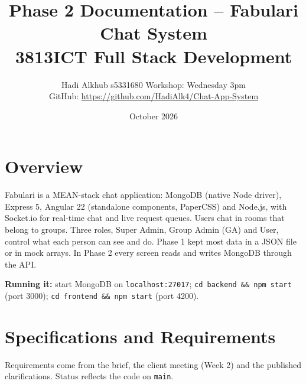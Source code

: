 \documentclass[10pt,a4paper]{article}
\title{\textbf{Phase 2 Documentation -- Fabulari Chat System}\\[2pt]\large 3813ICT Full Stack Development}
\author{Hadi Alkhub \quad s5331680 \quad Workshop: Wednesday 3pm\\
\small GitHub: \url{https://github.com/HadiAlk4/Chat-App-System}}
\date{October 2026}
\newcommand{\ep}[1]{\texttt{\small #1}}
\begin{document}
\maketitle

\section{Overview}
Fabulari is a MEAN-stack chat application: MongoDB (native Node driver), Express 5, Angular 22 (standalone components, PaperCSS) and Node.js, with Socket.io for real-time chat and live request queues. Users chat in rooms that belong to groups. Three roles, Super Admin, Group Admin (GA) and User, control what each person can see and do. Phase 1 kept most data in a JSON file or in mock arrays. In Phase 2 every screen reads and writes MongoDB through the API.

\textbf{Running it:} start MongoDB on \ep{localhost:27017}; \ep{cd backend \&\& npm start} (port 3000); \ep{cd frontend \&\& npm start} (port 4200).

\section{Specifications and Requirements}
Requirements come from the brief, the client meeting (Week 2) and the published clarifications. Status reflects the code on \ep{main}.
\end{document}
